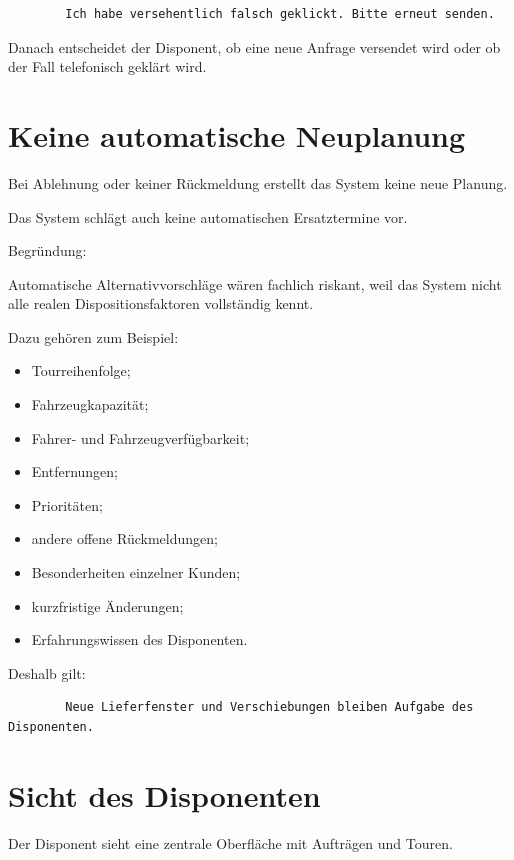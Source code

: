 \documentclass[12pt,a4paper]{article}
\begin{document}
	\begin{lstlisting}
		Ich habe versehentlich falsch geklickt. Bitte erneut senden.
	\end{lstlisting}
	
	Danach entscheidet der Disponent, ob eine neue Anfrage versendet wird oder ob der Fall telefonisch geklärt wird.
	
	\section{Keine automatische Neuplanung}
	
	Bei Ablehnung oder keiner Rückmeldung erstellt das System keine neue Planung.
	
	Das System schlägt auch keine automatischen Ersatztermine vor.
	
	Begründung:
	
	Automatische Alternativvorschläge wären fachlich riskant, weil das System nicht alle realen Dispositionsfaktoren vollständig kennt.
	
	Dazu gehören zum Beispiel:
	
	\begin{itemize}
		\item Tourreihenfolge;
		\item Fahrzeugkapazität;
		\item Fahrer- und Fahrzeugverfügbarkeit;
		\item Entfernungen;
		\item Prioritäten;
		\item andere offene Rückmeldungen;
		\item Besonderheiten einzelner Kunden;
		\item kurzfristige Änderungen;
		\item Erfahrungswissen des Disponenten.
	\end{itemize}
	
	Deshalb gilt:
	
	\begin{lstlisting}
		Neue Lieferfenster und Verschiebungen bleiben Aufgabe des Disponenten.
	\end{lstlisting}
	
	\section{Sicht des Disponenten}
	
	Der Disponent sieht eine zentrale Oberfläche mit Aufträgen und Touren.
	
\end{document}
